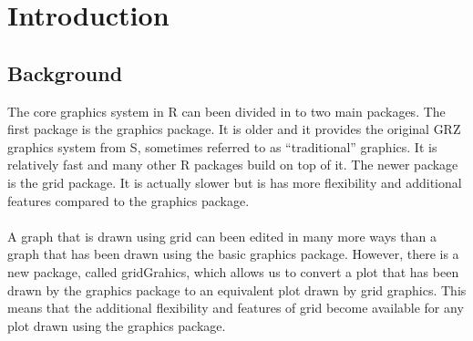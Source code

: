 \documentclass[a4paper,10pt]{article}\usepackage[]{graphicx}\usepackage[]{color}
\begin{document}
\section{Introduction}

\subsection{Background}
The core graphics system in R can been divided in to two main packages. The first package is the graphics package. It is older and it provides the original GRZ graphics system from S, sometimes referred to as ``traditional'' graphics. It is relatively fast and many other R packages build on top of it. The newer package is the grid package. It is actually slower but is has more flexibility and additional features compared to the graphics package. \\\\
A graph that is drawn using grid can been edited in many more ways than a graph that has been drawn using the basic graphics package. However, there is a new package, called gridGrahics, which allows us to convert a plot that has been drawn by the graphics package to an equivalent plot drawn by grid graphics. This means that the additional flexibility and features of grid become available for any plot drawn using the graphics package. 
\end{document}
